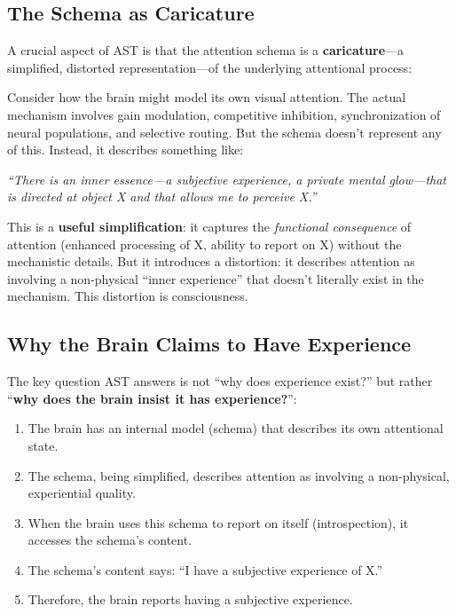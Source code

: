 \documentclass[11pt,a4paper]{report}
\begin{document}
\subsection{The Schema as Caricature}

A crucial aspect of AST is that the attention schema is a \textbf{caricature}---a simplified, distorted representation---of the underlying attentional process:

\begin{examplebox}
Consider how the brain might model its own visual attention. The actual mechanism involves gain modulation, competitive inhibition, synchronization of neural populations, and selective routing. But the schema doesn't represent any of this. Instead, it describes something like:

\emph{``There is an inner essence---a subjective experience, a private mental glow---that is directed at object X and that allows me to perceive X.''}

This is a \textbf{useful simplification}: it captures the \emph{functional consequence} of attention (enhanced processing of X, ability to report on X) without the mechanistic details. But it introduces a distortion: it describes attention as involving a non-physical ``inner experience'' that doesn't literally exist in the mechanism. This distortion is consciousness.
\end{examplebox}

\subsection{Why the Brain Claims to Have Experience}

The key question AST answers is not ``why does experience exist?'' but rather ``\textbf{why does the brain insist it has experience?}'':

\begin{enumerate}[leftmargin=2em]
  \item The brain has an internal model (schema) that describes its own attentional state.
  \item The schema, being simplified, describes attention as involving a non-physical, experiential quality.
  \item When the brain uses this schema to report on itself (introspection), it accesses the schema's content.
  \item The schema's content says: ``I have a subjective experience of X.''
  \item Therefore, the brain reports having a subjective experience.
\end{enumerate}
\end{document}
